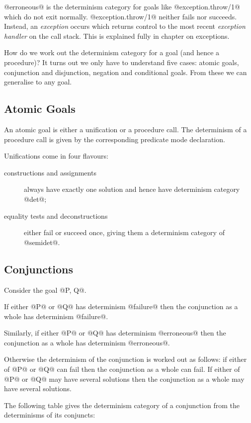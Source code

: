 @erroneous@ is the determinism category for goals like
@exception.throw/1@ which do not exit normally.  @exception.throw/1@
neither fails nor succeeds.  Instead, an \emph{exception} occurs which
returns control to the most recent \emph{exception handler} on the call
stack.    This is explained
fully in chapter \XXX{} on exceptions.

How do we work out the determinism category for a goal (and hence a
procedure)?  It turns out we only have to understand five cases:
atomic goals, conjunction and disjunction, negation and conditional
goals.  From these we can generalise to any goal.

\subsection{Atomic Goals}

An atomic goal is either a unification or a procedure call.  The
determinism of a procedure call is given by the corresponding predicate
mode declaration.

Unifications come in four flavours:
\begin{description}
\item [constructions and assignments] always have exactly one
solution and hence have determinism category @det@;
\item [equality tests and deconstructions] either fail or succeed once,
giving them a determinism category of @semidet@.
\end{description}

\subsection{Conjunctions}

Consider the goal @P, Q@.

If either @P@ or @Q@ has determinism @failure@ then the conjunction
as a whole has determinism @failure@.

Similarly, if either @P@ or @Q@ has determinism @erroneous@ then the
conjunction as a whole has determinism @erroneous@.

Otherwise the determinism of the conjunction is worked out as follows:
if either of @P@ or @Q@ can fail then the conjunction as a whole can
fail.  If either of @P@ or @Q@ may have several solutions then the
conjunction as a whole may have several solutions.

The following table gives the determinism category of a conjunction from
the determinisms of its conjuncts:

